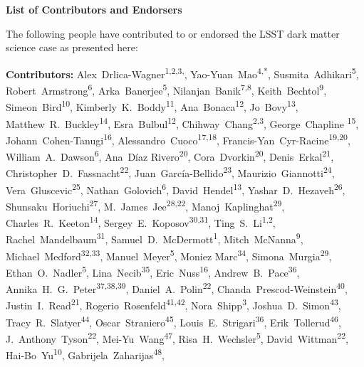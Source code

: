 
\begin{center}
  {\Large \bf List of Contributors and Endorsers}
\end{center}
\bigskip

The following people have contributed to or endorsed the LSST dark matter science case as presented here:

\def\altaffilmark#1{\textsuperscript{#1}}
\def\affil#1{\noindent #1 \\}

\normalsize
\begin{raggedright}
\textbf{Contributors:}
Alex~Drlica-Wagner\altaffilmark{1,2,3,\textdagger},
Yao-Yuan~Mao\altaffilmark{4,*},
Susmita~Adhikari\altaffilmark{5},
Robert~Armstrong\altaffilmark{6},
Arka~Banerjee\altaffilmark{5},
Nilanjan~Banik\altaffilmark{7,8},
Keith~Bechtol\altaffilmark{9},
Simeon~Bird\altaffilmark{10},
Kimberly~K.~Boddy\altaffilmark{11},
Ana~Bonaca\altaffilmark{12},
Jo~Bovy\altaffilmark{13},
Matthew~R.~Buckley\altaffilmark{14},
Esra~Bulbul\altaffilmark{12},
Chihway~Chang\altaffilmark{2,3},
George~Chapline \altaffilmark{15},
Johann~Cohen-Tanugi\altaffilmark{16},
Alessandro~Cuoco\altaffilmark{17,18},
Francis-Yan~Cyr-Racine\altaffilmark{19,20},
William~A.~Dawson\altaffilmark{6},
Ana~D\'{i}az Rivero\altaffilmark{20},
Cora~Dvorkin\altaffilmark{20},
Denis~Erkal\altaffilmark{21},
Christopher~D.~Fassnacht\altaffilmark{22},
Juan~Garc\'ia-Bellido\altaffilmark{23},
Maurizio~Giannotti\altaffilmark{24},
Vera~Gluscevic\altaffilmark{25},
Nathan~Golovich\altaffilmark{6},
David~Hendel\altaffilmark{13},
Yashar~D.~Hezaveh\altaffilmark{26},
Shunsaku~Horiuchi\altaffilmark{27},
M.~James~Jee\altaffilmark{28,22},
Manoj~Kaplinghat\altaffilmark{29},
Charles~R.~Keeton\altaffilmark{14},
Sergey~E.~Koposov\altaffilmark{30,31},
Ting~S.~Li\altaffilmark{1,2},
Rachel~Mandelbaum\altaffilmark{31},
Samuel~D.~McDermott\altaffilmark{1},
Mitch~McNanna\altaffilmark{9},
Michael~Medford\altaffilmark{32,33},
Manuel~Meyer\altaffilmark{5},
Moniez Marc\altaffilmark{34},
Simona~Murgia\altaffilmark{29},
Ethan~O.~Nadler\altaffilmark{5},
Lina~Necib\altaffilmark{35},
Eric~Nuss\altaffilmark{16},
Andrew~B.~Pace\altaffilmark{36},
Annika~H.~G.~Peter\altaffilmark{37,38,39},
Daniel~A.~Polin\altaffilmark{22},
Chanda~Prescod-Weinstein\altaffilmark{40},
Justin~I.~Read\altaffilmark{21},
Rogerio~Rosenfeld\altaffilmark{41,42},
Nora~Shipp\altaffilmark{3},
Joshua~D.~Simon\altaffilmark{43},
Tracy~R.~Slatyer\altaffilmark{44},
Oscar~Straniero\altaffilmark{45},
Louis~E.~Strigari\altaffilmark{36},
Erik~Tollerud\altaffilmark{46},
J.~Anthony~Tyson\altaffilmark{22},
Mei-Yu~Wang\altaffilmark{47},
Risa~H.~Wechsler\altaffilmark{5},
David~Wittman\altaffilmark{22},
Hai-Bo~Yu\altaffilmark{10},
Gabrijela~Zaharijas\altaffilmark{48},


\end{raggedright}
